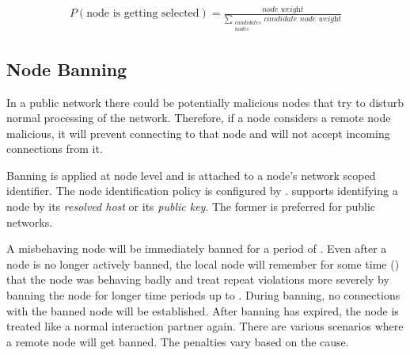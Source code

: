 \begin{align*}
P(\textrm{node is getting selected}) = \frac{\textit{node weight}}{\sum\limits_{\substack{candidates\\nodes}} \textit{candidate node weight}}
\end{align*}

\subsection{Node Banning}
\label{sec:reputation:NodeBanning}

In a public network there could be potentially malicious nodes that try to disturb normal processing of the network.
Therefore, if a node considers a remote node malicious, it will prevent connecting to that node and will not accept incoming connections from it.

Banning is applied at node level and is attached to a node's network scoped identifier.
The node identification policy is configured by .
\codenamespace supports identifying a node by its {\it resolved host} or its {\it public key}.
The former is preferred for public networks.

A misbehaving node will be immediately banned for a period of .
Even after a node is no longer actively banned, the local node will remember for some time () that the node was behaving badly and treat repeat violations more severely by banning the node for longer time periods up to .
During banning, no connections with the banned node will be established.
After banning has expired, the node is treated like a normal interaction partner again.
There are various scenarios where a remote node will get banned.
The penalties vary based on the cause.

